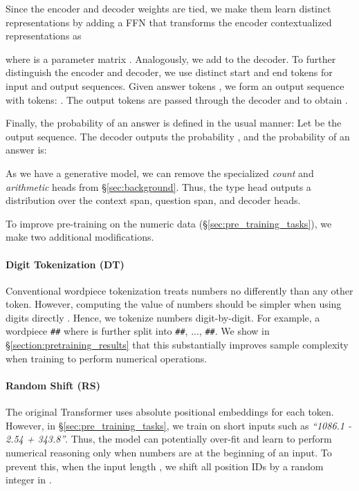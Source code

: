 \documentclass[11pt,a4paper]{article}
\begin{document}
Since the encoder and decoder weights are tied, we make them learn
distinct representations by adding a FFN
 that transforms the encoder
contextualized representations  as 

where  is a parameter matrix \cite{hendrycks2016gelu, ba2016layer}.
Analogously, we add  to the decoder. To further distinguish
the encoder and decoder, we use distinct start and end tokens for input and
output sequences. Given  answer tokens , we form
an output sequence with  tokens: . The output tokens
are passed through the decoder and  to obtain .

Finally, the probability of an answer is defined in the usual manner:
Let  be the output
sequence. The decoder outputs the probability , and the probability of an answer is: 




As we have a generative model, we can remove the specialized \emph{count} and \emph{arithmetic} heads
from \S\ref{sec:background}. Thus, the type head
 outputs a distribution  over the context span, question span, and decoder heads.

To improve pre-training on the numeric data
(\S\ref{sec:pre_training_tasks}), we make two
additional modifications.

\paragraph{Digit Tokenization (DT)} 
Conventional wordpiece tokenization treats numbers no differently than any other
token. However, computing the value of numbers should be simpler
when using digits directly \cite{wallace2019numeracy}.  
Hence, we tokenize numbers digit-by-digit.
For example, a wordpiece \texttt{\#\#} where  is further split into \texttt{\#\#},
..., \texttt{\#\#}. 
We show in \S\ref{section:pretraining_results} that this
substantially improves sample complexity when training to perform
numerical operations.

\paragraph{Random Shift (RS)}
The original Transformer uses absolute positional
embeddings for each token. 
However, in \S\ref{sec:pre_training_tasks}, we train on short inputs
such as \emph{``1086.1 - 2.54 + 343.8''}. Thus, the model can potentially over-fit and 
learn to 
perform numerical reasoning only when numbers are at the beginning of an input. To prevent this, when the
input length , we shift all position IDs by a random integer in
.
\end{document}
